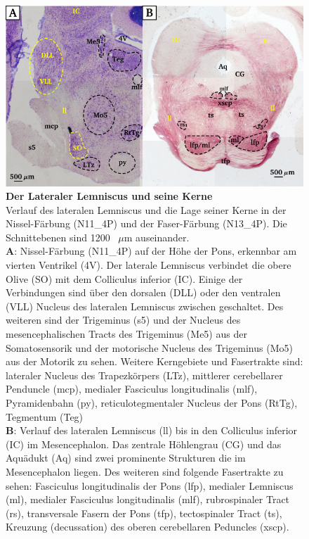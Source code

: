 \documentclass[12pt,a4paper,pdftex]{article}
\begin{document}
\begin{figure}[H]
    \centering
    \includegraphics[width = \textwidth]{pictures/auditory/lateral_lemniscus.png}
    \caption[Der Lateraler Lemniscus und seine Kerne]{\textbf{Der Lateraler Lemniscus und seine Kerne}\\ 
    Verlauf des lateralen Lemniscus und die Lage seiner Kerne in der Nissel-Färbung (N11\_4P) und der Faser-Färbung (N13\_4P). Die Schnittebenen sind 1200~ $\mu$m auseinander.\\
    \textbf{A}: Nissel-Färbung (N11\_4P) auf der Höhe der Pons, erkennbar am vierten Ventrikel (4V).
    Der laterale Lemniscus verbindet die obere Olive (SO) mit dem Colliculus inferior (IC). Einige der Verbindungen sind über den dorsalen (DLL) oder den ventralen (VLL) Nucleus des lateralen Lemniscus zwischen geschaltet. 
    Des weiteren sind der Trigeminus (s5) und der Nucleus des mesencephalischen Tracts des Trigeminus (Me5) aus der Somatosensorik und der motorische Nucleus des Trigeminus (Mo5) aus der Motorik zu sehen. 
    Weitere Kerngebiete und Fasertrakte sind: lateraler Nucleus des Trapezkörpers (LTz), mittlerer cerebellarer Penduncle (mcp), medialer Fasciculus longitudinalis (mlf), Pyramidenbahn (py), reticulotegmentaler Nucleus der Pons (RtTg), Tegmentum (Teg)\\
    \textbf{B}: Verlauf des lateralen Lemniscus (ll) bis in den Colliculus inferior (IC) im Mesencephalon. Das zentrale Höhlengrau (CG) und das Aquädukt (Aq) sind zwei prominente Strukturen die im Mesencephalon liegen. Des weiteren sind folgende Fasertrakte zu sehen: Fasciculus longitudinalis der Pons (lfp), medialer Lemniscus (ml), medialer Fasciculus longitudinalis (mlf), rubrospinaler Tract (rs), transversale Fasern der Pons (tfp), tectospinaler Tract (ts), Kreuzung (decussation) des oberen cerebellaren Peduncles (xscp).}
    \label{fig:lateraler_lemniscus}
\end{figure}
\end{document}

